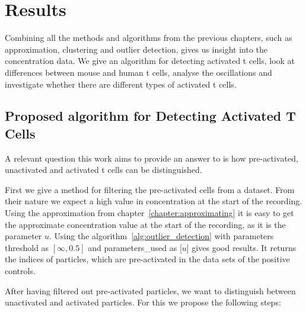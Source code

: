 \chapter{Results}
\label{chapter:results}

Combining all the methods and algorithms from the previous chapters, such as approximation, clustering and outlier detection, gives us insight into the \Calcium concentration data. We give an algorithm for detecting activated t cells, look at differences between mouse and human t cells, analyse the oscillations and investigate whether there are different types of activated t cells.

\section{Proposed algorithm for Detecting Activated T Cells}
\label{sec:proposed-algorithm}

A relevant question this work aims to provide an answer to is how pre-activated, unactivated and activated t cells can be distinguished.

First we give a method for filtering the pre-activated cells from a dataset. From their nature we expect a high value in \Calcium concentration at the start of the recording. Using the approximation from chapter~\ref{chapter:approximating} it is easy to get the approximate \Calcium concentration value at the start of the recording, as it is the parameter $u$. Using the algorithm~\ref{alg:outlier_detection} with parameters threshold as $[\infty, 0.5]$ and parameters\_used as [$u$] gives good results. It returns the indices of particles, which are pre-activated in the data sets of the positive controls.

After having filtered out pre-activated particles, we want to distinguish between unactivated and activated particles. For this we propose the following steps:

